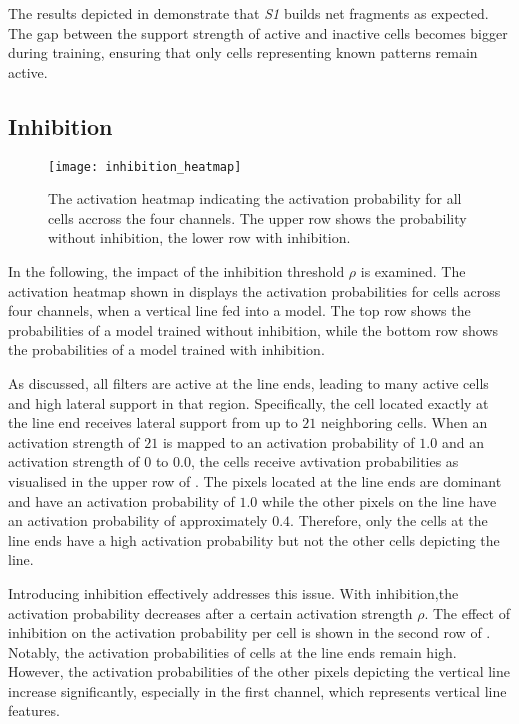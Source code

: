 The results depicted in  demonstrate that \emph{S1} builds net fragments as expected. The gap between the support strength of active and inactive cells becomes bigger during training, ensuring that only cells representing known patterns remain active.

\subsection{Inhibition}
%
\begin{figure}[h]
    \centering
    \texttt{[image: inhibition\_heatmap]}
    \caption[Activation heatmap with/without inhibition]{The activation heatmap indicating the activation probability for all cells accross the four channels. The upper row shows the probability without inhibition, the lower row with inhibition.}
\end{figure}
%
In the following, the impact of the inhibition threshold $\rho$ is examined. The activation heatmap shown in  displays the activation probabilities for cells across four channels, when a vertical line fed into a model.
The top row shows the probabilities of a model trained without inhibition, while the bottom row shows the probabilities of a model trained with inhibition.


As discussed, all filters are active at the line ends, leading to many active cells and high lateral support in that region.
Specifically, the cell located exactly at the line end receives lateral support from up to $21$ neighboring cells.
When an activation strength of $21$ is mapped to an activation probability of $1.0$ and an activation strength of $0$ to $0.0$, the cells receive avtivation probabilities as visualised in the upper row of .
The pixels located at the line ends are dominant and have an activation probability of $1.0$ while the other pixels on the line have an activation probability of approximately $0.4$.
Therefore, only the cells at the line ends have a high activation probability but not the other cells depicting the line.

Introducing inhibition effectively addresses this issue.
With inhibition,the activation probability decreases after a certain activation strength $\rho$.
The effect of inhibition on the activation probability per cell is shown in the second row of .
Notably, the activation probabilities of cells at the line ends remain high. However, the activation probabilities of the other pixels depicting the vertical line increase significantly, especially in the first channel, which represents vertical line features.

